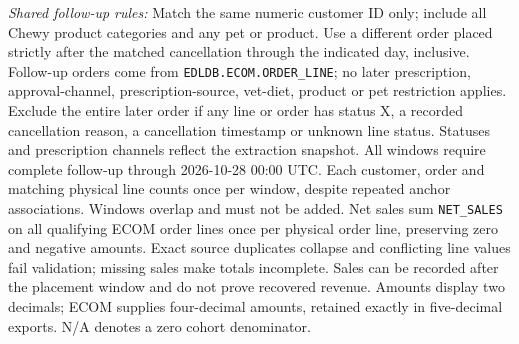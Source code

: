 \begin{table}[!htbp]
\begin{minipage}{\linewidth}
\textit{Shared follow-up rules:} Match the same numeric customer ID only; include all Chewy product categories and any pet or product. Use a different order
placed strictly after the matched cancellation through the indicated day, inclusive.
Follow-up orders come from \texttt{EDLDB.ECOM.ORDER\_LINE}; no later prescription, approval-channel, prescription-source, vet-diet, product or pet restriction applies.
Exclude the entire later order if any line or order has status X, a recorded cancellation reason,
a cancellation timestamp or unknown line status. Statuses and prescription channels reflect
the extraction snapshot. All windows require complete follow-up through 2026-10-28 00:00 UTC.
Each customer, order and matching physical line counts once per window, despite repeated
anchor associations. Windows overlap and must not be added. Net sales sum \texttt{NET\_SALES} on all qualifying ECOM order lines once per physical order line, preserving zero and negative amounts. Exact source duplicates collapse and conflicting line values fail validation; missing sales make totals incomplete.
Sales can be recorded after the placement window and do not prove recovered revenue.
Amounts display two decimals; ECOM supplies four-decimal amounts, retained exactly in five-decimal exports. N/A denotes a zero cohort denominator.
\end{minipage}
\end{table}
